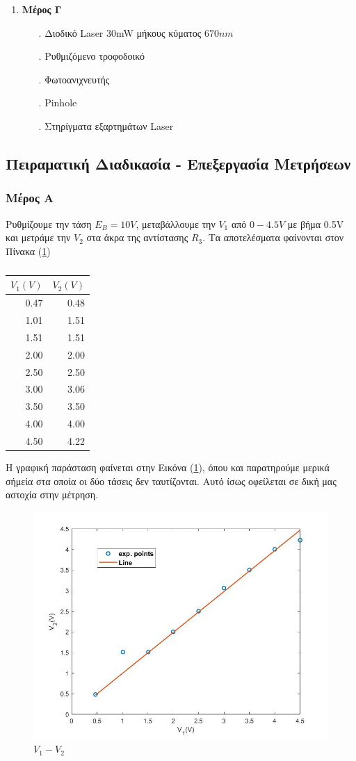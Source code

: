 \documentclass[a4paper]{article}
\begin{document}
\begin{enumerate}
			\item \textbf{Μέρος Γ}
				\begin{itemize}
					\item[.]  Διοδικό Laser 30mW μήκους κύματος $670nm$
					\item[.]  Ρυθμιζόμενο τροφοδοικό
					\item[.]  Φωτοανιχνευτής
					\item[.] Pinhole
					\item[.]  Στηρίγματα εξαρτημάτων Laser 
				\end{itemize}
		
		\end{enumerate}
	\vspace{-0.6cm}
\subsection*{Πειραματική Διαδικασία - Επεξεργασία Μετρήσεων}
	\subsubsection*{Μέρος Α}
	Ρυθμίζουμε την τάση $E_B=10V$, μεταβάλλουμε την $V_1$ από $0-4.5V$ με βήμα 0.5V και μετράμε την $V_2$ στα άκρα της αντίστασης $R_3$.
	Τα αποτελέσματα φαίνονται στον Πίνακα (\ref{mat1}) 
		\begin{table}[h!]
			\centering
			\begin{tabular}{r|r}
				$V_1(V)$ & $V_2(V)$ \\ \hline\hline
				 0.47&0.48\\
				1.01&1.51\\
				1.51&1.51\\
				2.00&2.00\\
				2.50&2.50\\
				3.00&3.06\\
				3.50&3.50\\
				4.00&4.00\\
				4.50&4.22			
			\end{tabular}
			\caption{ }
			\label{mat1}
		\end{table}
		
		Η γραφική παράσταση φαίνεται στην Εικόνα (\ref{im2}), όπου και παρατηρούμε μερικά σήμεία στα οποία οι δύο τάσεις δεν ταυτίζονται. Αυτό ίσως οφείλεται σε δική μας αστοχία στην μέτρηση.
		
		\begin{figure}[h!]
			\centering
			\includegraphics[width=0.65\linewidth]{plot1.jpg}
			\caption{$V_1-V_2$ }
			\label{im2}
		\end{figure}
		
\end{document}
